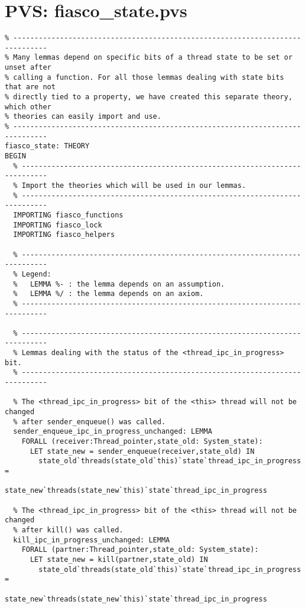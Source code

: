 \hypertarget{pvs_fiasco_state}{\chapter{PVS: fiasco\_state.pvs}}
\lstset{language=PVS}
\begin{lstlisting}
% ------------------------------------------------------------------------------
% Many lemmas depend on specific bits of a thread state to be set or unset after
% calling a function. For all those lemmas dealing with state bits that are not
% directly tied to a property, we have created this separate theory, which other
% theories can easily import and use.
% ------------------------------------------------------------------------------
fiasco_state: THEORY
BEGIN
  % ----------------------------------------------------------------------------
  % Import the theories which will be used in our lemmas.
  % ----------------------------------------------------------------------------
  IMPORTING fiasco_functions
  IMPORTING fiasco_lock
  IMPORTING fiasco_helpers
  
  % ----------------------------------------------------------------------------
  % Legend:
  %   LEMMA %- : the lemma depends on an assumption.
  %   LEMMA %/ : the lemma depends on an axiom.
  % ----------------------------------------------------------------------------

  % ----------------------------------------------------------------------------
  % Lemmas dealing with the status of the <thread_ipc_in_progress> bit.
  % ----------------------------------------------------------------------------

  % The <thread_ipc_in_progress> bit of the <this> thread will not be changed 
  % after sender_enqueue() was called.
  sender_enqueue_ipc_in_progress_unchanged: LEMMA
    FORALL (receiver:Thread_pointer,state_old: System_state):
      LET state_new = sender_enqueue(receiver,state_old) IN
        state_old`threads(state_old`this)`state`thread_ipc_in_progress =
          state_new`threads(state_new`this)`state`thread_ipc_in_progress
  
  % The <thread_ipc_in_progress> bit of the <this> thread will not be changed 
  % after kill() was called.
  kill_ipc_in_progress_unchanged: LEMMA
    FORALL (partner:Thread_pointer,state_old: System_state):
      LET state_new = kill(partner,state_old) IN
        state_old`threads(state_old`this)`state`thread_ipc_in_progress =
          state_new`threads(state_new`this)`state`thread_ipc_in_progress


\end{lstlisting}
